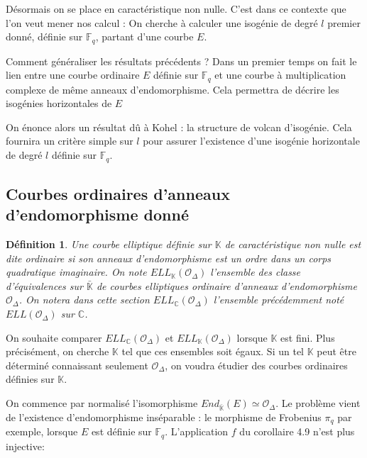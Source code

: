 \documentclass{article}
\newcommand{\C}[0]{\mathbb{C}}
\newcommand{\K}[0]{\mathbb{K}}
\newcommand{\Kb}[0]{\bar{\K}}
\newcommand{\OR}[0]{\mathcal{O}}
\newcommand{\F}[0]{\mathbb{F}}
\newtheorem{Def}[The]{Définition}
\begin{document}
Désormais on se place en caractéristique non nulle. C'est dans ce contexte que l'on veut mener nos calcul : On cherche à calculer une isogénie de degré $l$ premier donné, définie sur $\F_{q}$, partant d'une courbe $E$. 

Comment généraliser les résultats précédents ? Dans un premier temps on fait le lien entre une courbe ordinaire $E$ définie sur $\F_{q}$ et une courbe à multiplication complexe de même anneaux d'endomorphisme. Cela permettra de décrire les isogénies horizontales de $E$

On énonce alors un résultat dû à Kohel : la structure de volcan d'isogénie. Cela fournira un critère simple sur $l$ pour assurer l'existence d'une isogénie horizontale de degré $l$ définie sur $\F_{q}$.  



\subsection{Courbes ordinaires d'anneaux d'endomorphisme donné}



\begin{Def}
	Une courbe elliptique définie sur $\K$ de caractéristique non nulle est dite ordinaire si son anneaux d'endomorphisme est un ordre dans un corps quadratique imaginaire. 
	On note $ELL_{\K}(\OR_{\Delta})$ l'ensemble des classe d'équivalences sur $\Kb$ de courbes elliptiques ordinaire d'anneaux d'endomorphisme $\OR_{\Delta}$.
	On notera dans cette section $ELL_{\C}(\OR_{\Delta})$ l'ensemble précédemment noté $ELL(\OR_{\Delta})$ sur $\C$. 
\end{Def}

On souhaite comparer $ELL_{\C}(\OR_{\Delta})$ et $ELL_{\K}(\OR_{\Delta})$ lorsque $\K$ est fini. Plus précisément, on cherche $\K$ tel que ces ensembles soit égaux. Si un tel $\K$ peut être déterminé connaissant seulement $\OR_{\Delta}$, on voudra étudier des courbes ordinaires définies sur $\K$. 

On commence par normalisé l'isomorphisme $End_{\Kb}(E)\simeq\OR_{\Delta}$. Le problème vient de l'existence d'endomorphisme inséparable : le morphisme de Frobenius $\pi_{q}$ par exemple, lorsque $E$ est définie sur $\F_{q}$. L'application $f$ du corollaire 4.9 n'est plus injective:
\end{document}
